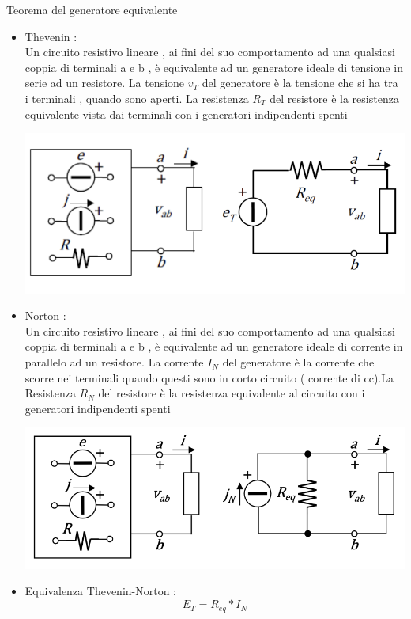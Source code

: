 \documentclass{article}
\theoremstyle{definition}
\begin{document}
\begin{teo*}{Teorema del generatore equivalente }
	\begin{itemize}
		\item Thevenin : \\
		Un circuito resistivo lineare , ai fini del suo comportamento ad una qualsiasi coppia di terminali a e b ,  è equivalente ad un generatore ideale di tensione in serie ad un resistore. La tensione $v_T$ del generatore è la tensione che si ha tra i terminali , quando sono aperti. La resistenza $R_T$ del resistore è la resistenza equivalente vista dai terminali   con i generatori indipendenti spenti 
		\begin{center}
			\includegraphics[scale=0.40]{immagini/th}
		\end{center}
		\item Norton :\\
		 Un circuito resistivo lineare , ai fini del suo comportamento ad una qualsiasi coppia di terminali a e b ,  è equivalente ad un generatore ideale di corrente in parallelo ad un resistore. La corrente $I_N$ del generatore è la corrente che scorre nei terminali quando questi sono in corto circuito ( corrente di cc).La Resistenza $R_N$ del resistore è la resistenza equivalente al circuito con i generatori indipendenti spenti	
		\begin{center}
			\includegraphics[scale=0.45]{immagini/Nor}
		\end{center}
		\item Equivalenza Thevenin-Norton : 
		$$E_T=R_{eq}*I_N$$
	 \end{itemize}
\end{teo*}
\end{document}
